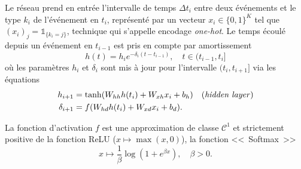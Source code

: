 \documentclass[../main.tex]{subfiles}
\begin{document}
Le réseau prend en entrée l'intervalle de temps $\Delta t_i$ entre deux événements et le type $k_i$ de l'événement en $t_i$, représenté par un vecteur $x_i\in{\{0,1\}}^K$ tel que $(x_i)_j = \mathds{1}_{\{k_i = j\}}$, technique qui s'appelle encodage \textit{one-hot}\footnotemark.
Le temps écoulé depuis un événement en $t_{i-1}$ est pris en compte par amortissement
\begin{equation}
h(t) = h_{i}e^{-\delta_i(t-t_{i-1})},\quad t\in(t_{i-1},t_i]
\end{equation}
où les paramètres $h_i$ et $\delta_i$ sont mis à jour pour l'intervalle $(t_i,t_{i+1}]$ via les équations
\begin{subequations}
\begin{align}
	h_{i+1} &= \tanh(W_{hh}h(t_i) + W_{xh}x_i + b_{h})\quad\text{(\textit{hidden layer})} \\
	\delta_{i+1} &= f(W_{hd}h(t_i) + W_{xd}x_i + b_d).
\end{align}
\end{subequations}

La fonction d'activation $f$ est une approximation de classe $\mathcal C^1$ et strictement positive de la fonction ReLU ($x\mapsto \max(x,0)$), la fonction <<~Softmax~>>
\[
x\mapsto \frac{1}{\beta}\log(1+e^{\beta x}),\quad\beta > 0.
\]
\end{document}
